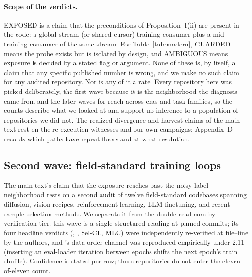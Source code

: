 \paragraph{Scope of the verdicts.}
EXPOSED is a claim that the preconditions of Proposition~1(ii) are present
in the code: a global-stream (or shared-cursor) training consumer plus a
mid-training consumer of the same stream. For Table~\ref{tab:modern},
GUARDED means the probe exists but is isolated by design, and AMBIGUOUS
means exposure is decided by a stated flag or argument. None of these is,
by itself, a claim
that any specific published number is wrong, and we make no such claim for
any audited repository. Nor is any of it a rate. Every repository here was
picked deliberately, the first wave because it is the neighborhood the
diagnosis came from and the later waves for reach across eras and task
families, so the counts describe what we looked at and support no inference
to a population of repositories we did not. The realized-divergence and harvest claims of the
main text rest on the re-execution witnesses and our own campaigns;
Appendix~D records which paths have repeat floors and at what resolution.

\subsection{Second wave: field-standard training loops}
\label{sec:audit-fieldwide}

The main text's claim that the exposure reaches past the noisy-label
neighborhood rests on a second audit of twelve field-standard codebases spanning
diffusion, vision recipes, reinforcement learning, LLM finetuning, and recent
sample-selection methods. We separate it from the double-read core by
verification tier: this wave is a single structured reading at pinned commits;
its four headline verdicts (, ,
Sel-CL, MLC) were independently re-verified at file--line by the authors, and
's data-order channel was reproduced empirically under 
2.11 (inserting an eval-loader iteration between epochs shifts the next epoch's
train shuffle). Confidence is stated per row; these repositories do not enter
the eleven-of-eleven count.


